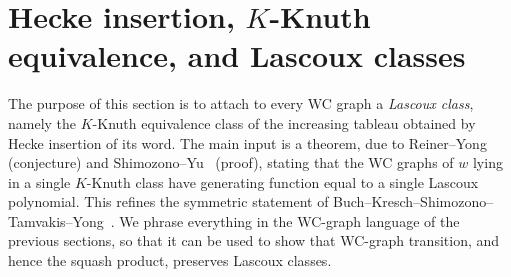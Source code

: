 \documentclass{amsart}
\theoremstyle{definition}
\theoremstyle{remark}
\numberwithin{equation}{subsection}
\begin{document}
\section{Hecke insertion, \texorpdfstring{$K$}{K}-Knuth equivalence, and Lascoux classes}
\label{section:kknuth}

The purpose of this section is to attach to every WC graph a \emph{Lascoux
class}, namely the $K$-Knuth equivalence class of the increasing tableau obtained
by Hecke insertion of its word. The main input is a theorem, due to
Reiner--Yong~\cite{reiner2021grothlascoux} (conjecture) and
Shimozono--Yu~\cite{shimozono2021grothlascoux} (proof), stating that the WC
graphs of $w$ lying in a single $K$-Knuth class have generating function equal to
a single Lascoux polynomial. This refines the symmetric statement of
Buch--Kresch--Shimozono--Tamvakis--Yong~\cite{buch2008factorsequences}. We phrase
everything in the WC-graph language of the previous sections, so that it can be
used to show that WC-graph transition, and hence the squash product, preserves
Lascoux classes.

\newcommand{\kk}{\overset{K}{\equiv}}
\newcommand{\hprod}{\bullet}
\newcommand{\Pw}{\mathsf{P}}
\newcommand{\Qw}{\mathsf{Q}}
\newcommand{\dwd}{\mathtt{dw}}
\newcommand{\lasc}{\mathfrak{L}}
\newcommand{\pib}{\pi^{(\beta)}}




\end{document}
